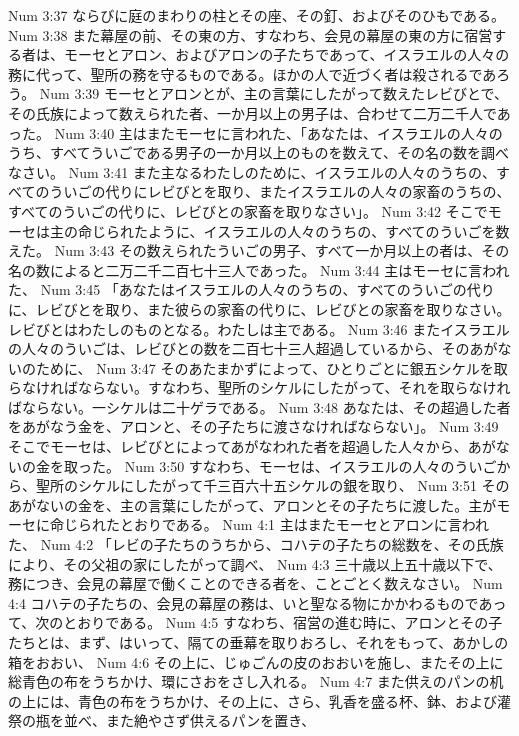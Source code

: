 Num 3:37  ならびに庭のまわりの柱とその座、その釘、およびそのひもである。
Num 3:38  また幕屋の前、その東の方、すなわち、会見の幕屋の東の方に宿営する者は、モーセとアロン、およびアロンの子たちであって、イスラエルの人々の務に代って、聖所の務を守るものである。ほかの人で近づく者は殺されるであろう。
Num 3:39  モーセとアロンとが、主の言葉にしたがって数えたレビびとで、その氏族によって数えられた者、一か月以上の男子は、合わせて二万二千人であった。
Num 3:40  主はまたモーセに言われた、「あなたは、イスラエルの人々のうち、すべてういごである男子の一か月以上のものを数えて、その名の数を調べなさい。
Num 3:41  また主なるわたしのために、イスラエルの人々のうちの、すべてのういごの代りにレビびとを取り、またイスラエルの人々の家畜のうちの、すべてのういごの代りに、レビびとの家畜を取りなさい」。
Num 3:42  そこでモーセは主の命じられたように、イスラエルの人々のうちの、すべてのういごを数えた。
Num 3:43  その数えられたういごの男子、すべて一か月以上の者は、その名の数によると二万二千二百七十三人であった。
Num 3:44  主はモーセに言われた、
Num 3:45  「あなたはイスラエルの人々のうちの、すべてのういごの代りに、レビびとを取り、また彼らの家畜の代りに、レビびとの家畜を取りなさい。レビびとはわたしのものとなる。わたしは主である。
Num 3:46  またイスラエルの人々のういごは、レビびとの数を二百七十三人超過しているから、そのあがないのために、
Num 3:47  そのあたまかずによって、ひとりごとに銀五シケルを取らなければならない。すなわち、聖所のシケルにしたがって、それを取らなければならない。一シケルは二十ゲラである。
Num 3:48  あなたは、その超過した者をあがなう金を、アロンと、その子たちに渡さなければならない」。
Num 3:49  そこでモーセは、レビびとによってあがなわれた者を超過した人々から、あがないの金を取った。
Num 3:50  すなわち、モーセは、イスラエルの人々のういごから、聖所のシケルにしたがって千三百六十五シケルの銀を取り、
Num 3:51  そのあがないの金を、主の言葉にしたがって、アロンとその子たちに渡した。主がモーセに命じられたとおりである。
Num 4:1  主はまたモーセとアロンに言われた、
Num 4:2  「レビの子たちのうちから、コハテの子たちの総数を、その氏族により、その父祖の家にしたがって調べ、
Num 4:3  三十歳以上五十歳以下で、務につき、会見の幕屋で働くことのできる者を、ことごとく数えなさい。
Num 4:4  コハテの子たちの、会見の幕屋の務は、いと聖なる物にかかわるものであって、次のとおりである。
Num 4:5  すなわち、宿営の進む時に、アロンとその子たちとは、まず、はいって、隔ての垂幕を取りおろし、それをもって、あかしの箱をおおい、
Num 4:6  その上に、じゅごんの皮のおおいを施し、またその上に総青色の布をうちかけ、環にさおをさし入れる。
Num 4:7  また供えのパンの机の上には、青色の布をうちかけ、その上に、さら、乳香を盛る杯、鉢、および灌祭の瓶を並べ、また絶やさず供えるパンを置き、
